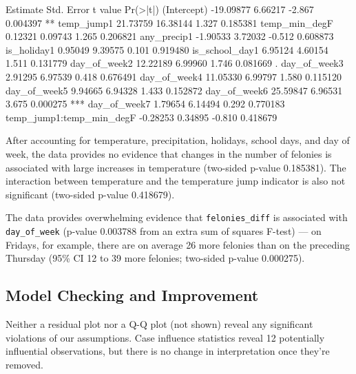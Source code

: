 \documentclass[11pt,notitlepage]{article}
\newenvironment{codeSmall}%
   {\par\noindent\adjustbox{margin=1ex,bgcolor=shadecolor,margin=0ex \medskipamount}\bgroup\minipage\linewidth\verbatim\footnotesize}%
   {\endverbatim\endminipage\egroup}
\begin{document}
\begin{codeSmall}
                          Estimate Std. Error t value Pr(>|t|)    
(Intercept)              -19.09877    6.66217  -2.867 0.004397 ** 
temp_jump1                21.73759   16.38144   1.327 0.185381    
temp_min_degF              0.12321    0.09743   1.265 0.206821    
any_precip1               -1.90533    3.72032  -0.512 0.608873    
is_holiday1                0.95049    9.39575   0.101 0.919480    
is_school_day1             6.95124    4.60154   1.511 0.131779    
day_of_week2              12.22189    6.99960   1.746 0.081669 .  
day_of_week3               2.91295    6.97539   0.418 0.676491    
day_of_week4              11.05330    6.99797   1.580 0.115120    
day_of_week5               9.94665    6.94328   1.433 0.152872    
day_of_week6              25.59847    6.96531   3.675 0.000275 ***
day_of_week7               1.79654    6.14494   0.292 0.770183    
temp_jump1:temp_min_degF  -0.28253    0.34895  -0.810 0.418679    
\end{codeSmall}




After accounting for temperature, precipitation, holidays, school days, and day of week, the data provides no evidence that changes in the number of felonies is associated with large increases in temperature (two-sided p-value 0.185381). The interaction between temperature and the temperature jump indicator is also not significant (two-sided p-value 0.418679).

The data provides overwhelming evidence that \texttt{felonies_diff} is associated with \texttt{day_of_week} (p-value 0.003788 from an extra sum of squares F-test) --- on Fridays, for example, there are on average 26 more felonies than on the preceding Thursday (95\% CI 12 to 39 more felonies; two-sided p-value 0.000275).


\subsection{Model Checking and Improvement}

Neither a residual plot nor a Q-Q plot (not shown) reveal any significant violations of our assumptions. Case influence statistics reveal 12 potentially influential observations, but there is no change in interpretation once they're removed.
\end{document}

